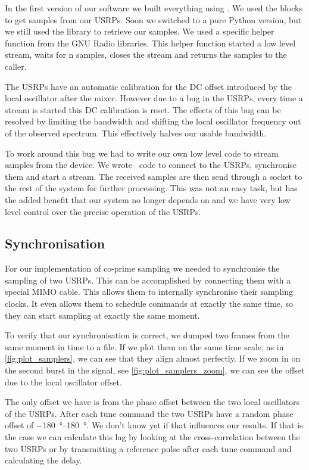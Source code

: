 \documentclass[a4paper, openany, oneside]{memoir}
\begin{document}
In the first version of our software we built everything using . We used the  blocks to get samples from our USRPs. Soon we switched to a pure Python version, but we still used the  library to retrieve our samples. We used a specific helper function  from the GNU Radio libraries. This helper function started a low level stream, waits for n samples, closes the stream and returns the samples to the caller.

The USRPs have an automatic calibration for the DC offset introduced by the local oscillator after the mixer. However due to a bug in the USRPs, every time a stream is started this DC calibration is reset. The effects of this bug can be resolved by limiting the bandwidth and shifting the local oscillator frequency out of the observed spectrum. This effectively halves our usable bandwidth.

To work around this bug we had to write our own low level code to stream samples from the device. We wrote \CC~code to connect to the USRPs, synchronise them and start a stream. The received samples are then send through a socket to the rest of the system for further processing. This was not an easy task, but has the added benefit that our system no longer depends on  and we have very low level control over the precise operation of the USRPs.


\subsection{Synchronisation}
For our implementation of co-prime sampling we needed to synchronise the sampling of two USRPs. This can be accomplished by connecting them with a special MIMO cable. This allows them to internally synchronise their sampling clocks. It even allows them to schedule commands at exactly the same time, so they can start sampling at exactly the same moment.

To verify that our synchronisation is correct, we dumped two frames from the same moment in time to a file. If we plot them on the same time scale, as in \cref{fig:plot_samplers}, we can see that they align almost perfectly. If we zoom in on the second burst in the signal, see \cref{fig:plot_samplers_zoom}, we can see the offset due to the local oscillator offset.

The only offset we have is from the phase offset between the two local oscillators of the USRPs. After each tune command the two USRPs have a random phase offset of \SIrange[retain-explicit-plus]{-180}{+180}{\degree}.  We don't know yet if that influences our results. If that is the case we can calculate this lag by looking at the cross-correlation between the two USRPs or by transmitting a reference pulse after each tune command and calculating the delay.
\end{document}
